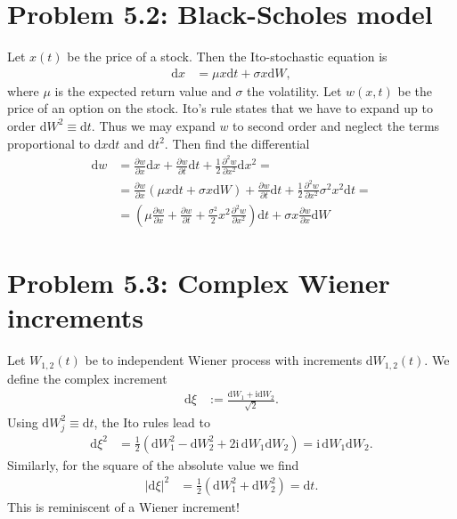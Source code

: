 \documentclass[english, parskip=full]{scrartcl}
\newcommand{\kla}{}
\newcommand{\tecxt}{}
\renewcommand{\i}{\text{i}}
\begin{document}
\section*{Problem 5.2: Black-Scholes model}
Let $x(t)$ be the price of a stock.
Then the Ito-stochastic equation is
\begin{align}
\tecxt\text{d}x &= \mu x \tecxt\text{d}t + \sigma x \tecxt\text{d}W,
\end{align}
where $\mu$ is the expected return value and $\sigma$ the volatility.
Let $w(x,t)$ be the price of an option on the stock.
Ito's rule states that we have to expand up to order $\tecxt\text{d}W^2\equiv \tecxt\text{d}t$.
Thus we may expand $w$ to second order and neglect the terms proportional to $\tecxt\text{d}x \tecxt\text{d}t$ and $\tecxt\text{d}t^2$. 
Then find the differential
\begin{align}
\tecxt\text{d}w &= \frac{\partial w}{\partial x} \tecxt\text{d}x + \frac{\partial w}{\partial t} \tecxt\text{d}t + \frac{1}{2} \frac{\partial^2 w}{\partial x^2} \tecxt\text{d}x^2 = \\
&= \frac{\partial w}{\partial x} \kla\left( {\mu x \tecxt\text{d}t + \sigma x \tecxt\text{d}W} \right) + \frac{\partial w}{\partial t} \tecxt\text{d}t + \frac{1}{2} \frac{\partial^2 w}{\partial x^2} \sigma^2x^2 \tecxt\text{d}t = \\
&= \kla\left( {\mu \frac{\partial w}{\partial x} + \frac{\partial w}{\partial t} + \frac{\sigma^2}{2} x^2  \frac{\partial^2 w}{\partial x^2} } \right) \tecxt\text{d}t + \sigma x \frac{\partial w}{\partial x} \tecxt\text{d}W
\end{align}



\section*{Problem 5.3: Complex Wiener increments}
Let $W_{1,2}(t)$ be to independent Wiener process with increments $\tecxt\text{d}W_{1,2}(t)$.
We define the complex increment
\begin{align}
\tecxt\text{d}\xi &:= \frac{\tecxt\text{d}W_1 +
 \i \tecxt\text{d}W_2}{\sqrt{2}}.
\end{align}
Using $\tecxt\text{d}W_j^2 \equiv \tecxt\text{d}t$, the Ito rules lead to
\begin{align}
\tecxt\text{d}\xi^2 &= \frac{1}{2} \kla\left( {\tecxt\text{d}W_1^2 - \tecxt\text{d}W_2^2 + 2\i\,\tecxt\text{d}W_1 \tecxt\text{d}W_2 } \right) = \i\,\tecxt\text{d}W_1 \tecxt\text{d}W_2.
\end{align}
Similarly, for the square of the absolute value we find
\begin{align}
|\tecxt\text{d}\xi|^2 &= \frac{1}{2} \kla\left( { \tecxt\text{d}W_1^2 + \tecxt\text{d}W_2^2 } \right) = \tecxt\text{d}t.
\end{align}
This is reminiscent of a Wiener increment!
\end{document}
